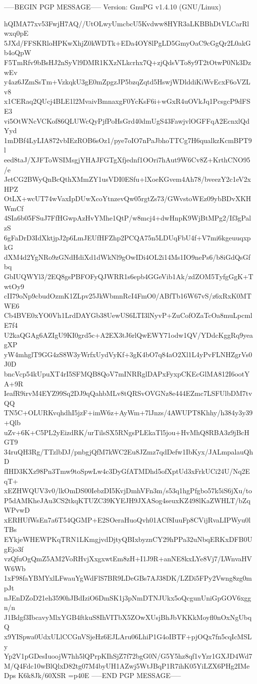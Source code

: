 -----BEGIN PGP MESSAGE-----
Version: GnuPG v1.4.10 (GNU/Linux)

hQIMA77xv53FwjH7AQ//UtOLwyUmcbcU5Kvdww8HYR3aLKBBhDtVLCarRlwxq0pE
5JXd/FFSKRloHPKwXhjZ0kWDTk+EDa4OY8lPgLD5GmyOaC9cGgQr2L0akGb4oQpW
F5TmRfv9bBsHJ2nSyVl9DMR1KXzNLkcrhx7Q+zjQdsVTo8y9T2tOtwP0Nk3DzwEv
y4az6JZmSsTm+VzkqkU3gE0mZpgzJP5bzqZqtd5HswjWDlddiKiWvEcxF6oVZLv8
x1CERaq2QUcj4BLE1l2MvaivBmnaxgF0YcKsF6i+wGxR4uOVkJq1PcsgcP9dFSE3
vi5OtWNcVCKof86QLUWcQyPjfPoHsGrd40dmUgS43FawjvlOGFFqA2EcnxlQdYyd
1mDBf4LyLIA872vbIEzROB6sOz1/pye7oIO7nPaJbhoTTCg7H6qualkzKcmBPT9l
eed8taJ/XJFToWSIMsgjYHAJFGTgXfjednf1OOri7hAut9W6Cv8Z+KrthCNO95/e
JetCG2BWyQnBcQthXMmZY1usVDI0ESfu+lXoeKGvem4Ah78/bveezY2c1eV2xHPZ
OtLX+wcUT74wVaxIpDUwXcoYtnzevQw05rgtZs73/GWvstoWEz09ybBDvXKHWmCf
4SIa6b05FSuJ7FfHGwpAzHvYMhe1QtP/w8mcj4+dwHnpK9WjBtMPg2/If3gPalzS
6gFaDrD3IdXktjpJ2p6LmJEUfHFZhp2PCQA75n5LDUqFbU4f+V7mi6kgeuuqxpkG
dXM4d2YgNRo9zGNdHdiXd1dWkNl9gOwIDi4OL2i14Ms1IO9nePs6/b8iGdQsGfbq
GbIUQWYl3/2EQ8gsPBFOFyQJWRR1s6epb4GGeVib1Ak/zdZOM5TyfgGgK+TwtOy9
cII79oNp9cbudOzmK1ZLpv25JkWbmnRcI4FmO0/ABfTb16W67vS/z6xRxK0MTWE6
Cb4BVE0xYO0Vh1LrdDAYGb38UewUS6LTI3lNyvP+ZuCofOZaTcOa8muLpcmlE7f4
U2kaQGAg6AZIgU9KI0grd5c+A2EX3tJ6rlQwEWY71odw1QV/YDdcKggRq9yeagXP
yW4mhglT9GG4zS8W3yWrfxUydVyKf+3gK4bO7q84aO2Xl1L4yPvFLNHZgrVs0J0D
bncVcp54kUpuXT4rI5SFMQB8QoV7mINRRglDAPxFyxpCKEcGlMA812I6ootYA+9R
IeafR9irvM4EYZ99Sq2DJ9qQahbMLv8tQRSvOVGNz8e444EZmc7LSFUlbDM7tvQQ
TN5C+OLURKvqhdhI5jzF+imW6z+AyWm+7lJnzs/4AWUPT8Khhy/h384y3y39+Qlb
uZv+6K+C5PL2yEizdRK/urTilsSX5RNgsPLEkaTl5jou+HvMhQ8RBA3z9jBcHGT9
34ruQH3Rg/TTzlbDJ/pnbgjQfM7kWC2Eu8JZmz7qdDefw1IbKyx/JALmpalauQhD
fIHD3KXz98Pn3Tmw9toSpwLw4c3DyGfATMDhd5ofXptUd3xFrkUCi24U/Nq2EqT+
xEZHWQUV3v0/lkOmDS00IebzDI5KvjDmhVFn3m/s53q1hgPfgbo57k5iS6jXu/to
P5dAMKheJAu3CS2tkqKTUZC39KYEJH9JXASog4seuxKZ498lKaZWHLT/bZqWPvwD
xERHUfWsEn7a6T54QGMP+E2SOeraHuoQvh01ACf8IuuFp8CVijRvaLIPWyu0lTBs
EYkjeWHEWPKqTRN1LKmgjvdDjtyQBIxbyznCY29hPPa32uNbqERKxDFB0UgEjo3f
vzQfuOgQmZ5AM2VoRHvjXxgxwtEm8zH+I1J9R+anNE8kxLYe8Vj7/LWnvaHVW6Wb
1xF98faYBMYxlLFwauYgWdFlS7BR9LDeGBs7AJ38DK/LZDi5FPy2Vwng8zg0mpJt
nJEnDZoD21eh3590hJBdIziO6DmSK1j3pNmDTNJUkx5oQcgunUniGpGOV6xggn/n
J1Bdgf3IbcavyMlxYGB4ftkuS8IhVITbX5ZOwXUsjBhJbVKKkMoyfl0nOxNgUbqQ
x9YISpwa0UdxULlCCGnVSjeHz6EJLAru06LhiP1G4oIBTF+pjOQx7fn5cqIcMSLy
Yp2V1pGDesIuoojW7hh5lQPrpKIhSjZ7f72bgG0N/G5Y5hz8qf1vYzr1GXJD4Wd7
M/Q4Fdc10wBlQlxD82tg07M4byUH1AZwj5WtJBqP1R7ihK05YiLZX6PHg2IMeDps
K6k8Jk/60XSR
=p40E
-----END PGP MESSAGE-----
